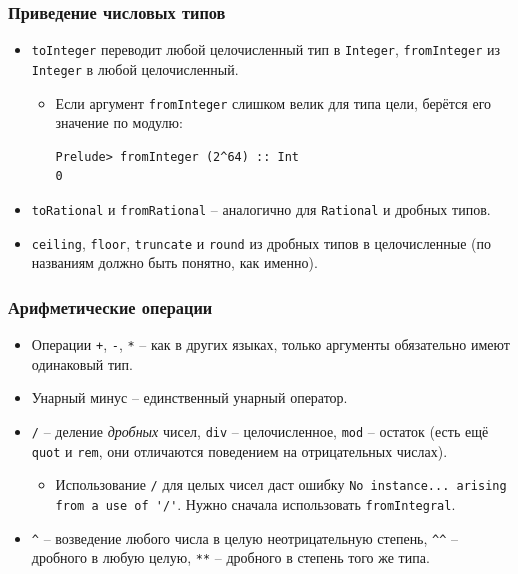 \documentclass[12pt]{beamer}
\begin{document}
\begin{frame}[fragile]
\frametitle{Приведение числовых типов}
\begin{itemize}
    \item \lstinline|toInteger| переводит любой целочисленный тип в \lstinline|Integer|, \lstinline|fromInteger| из \lstinline|Integer| в любой целочисленный.
    \begin{itemize}
        \item Если аргумент \lstinline|fromInteger| слишком велик для типа цели, берётся его значение по модулю:
        \begin{lstlisting}
Prelude> fromInteger (2^64) :: Int
0
\end{lstlisting}
    \end{itemize}
    \item \lstinline|toRational| и \lstinline|fromRational| -- аналогично для \lstinline|Rational| и дробных типов.
    \item \lstinline|ceiling|, \lstinline|floor|, \lstinline|truncate| и \lstinline|round| из дробных типов в целочисленные (по названиям должно быть понятно, как именно).
\end{itemize}
\end{frame}

\begin{frame}[fragile]
\frametitle{Арифметические операции}
\begin{itemize}
    \item Операции \lstinline|+|, \lstinline|-|, \lstinline|*| -- как в других языках, только аргументы обязательно имеют одинаковый тип.
    \item Унарный минус -- единственный унарный оператор.
    \item \lstinline|/| -- деление \emph{дробных} чисел, \lstinline|div| -- целочисленное, \lstinline|mod| -- остаток (есть ещё \lstinline|quot| и \lstinline|rem|, они отличаются поведением на отрицательных числах).
    \begin{itemize}
        \item Использование \lstinline|/| для целых чисел даст ошибку \lstinline|No instance... arising from a use of '/'|. Нужно сначала использовать \lstinline|fromIntegral|.
    \end{itemize}        
    \item \lstinline|^| -- возведение любого числа в целую неотрицательную степень, \lstinline|^^| -- дробного в любую целую, \lstinline|**| -- дробного в степень того же типа.
\end{itemize}
\end{frame}
\end{document}
